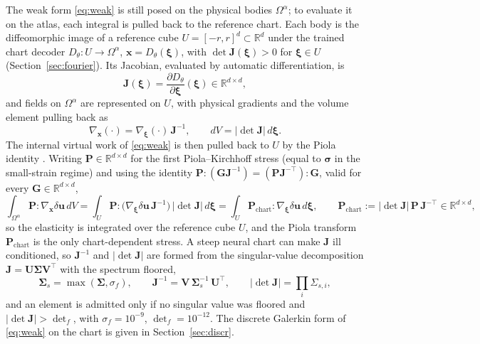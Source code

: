 \documentclass{svjour3}                 %
\newcommand{\R}{\mathbb{R}}
\newcommand{\abs}[1]{\lvert#1\rvert}
\newcommand{\xbf}{\bm{x}}
\newcommand{\ubf}{\bm{u}}
\newcommand{\grad}{\nabla}
\begin{document}
The weak form \eqref{eq:weak} is still posed on the physical bodies $\Omega^\alpha$; to evaluate it on the
atlas, each integral is pulled back to the reference chart. Each body is the diffeomorphic image of a reference
cube $U=[-r,r]^d\subset\R^d$ under the trained chart decoder $D_\theta:U\to\Omega^\alpha$,
$\xbf=D_\theta(\bm\xi)$, with $\det\bm J(\bm\xi)>0$ for $\bm\xi\in U$
(Section~\ref{sec:fourier}). Its Jacobian, evaluated by automatic differentiation, is
\begin{equation}\label{eq:chart-jacobian}
\bm J(\bm\xi)=\frac{\partial D_\theta}{\partial\bm\xi}(\bm\xi)\in\R^{d\times d},
\end{equation}
and fields on $\Omega^\alpha$ are represented on $U$, with physical gradients and the volume element pulling
back as
\begin{equation}\label{eq:pushforward}
\grad_{\xbf}(\cdot)=\grad_{\bm\xi}(\cdot)\,\bm J^{-1},\qquad dV=\abs{\det\bm J}\,d\bm\xi .
\end{equation}
The internal virtual work of \eqref{eq:weak} is then pulled back to $U$ by the Piola identity
\citep{sun2026neuralatlas}. Writing $\bm P\in\R^{d\times d}$ for the first Piola--Kirchhoff stress (equal to
$\bm\sigma$ in the small-strain regime) and using the identity $\bm P:(\bm G\bm J^{-1})=
(\bm P\bm J^{-\top}):\bm G$, valid for every $\bm G\in\R^{d\times d}$,
\begin{equation}\label{eq:piola}
\int_{\Omega^\alpha}\!\bm P:\grad_{\xbf}\delta\ubf\,dV
=\int_{U}\!\bm P:\big(\grad_{\bm\xi}\delta\ubf\,\bm J^{-1}\big)\,\abs{\det\bm J}\,d\bm\xi
=\int_{U}\!\bm P_{\mathrm{chart}}:\grad_{\bm\xi}\delta\ubf\,d\bm\xi ,\qquad
\bm P_{\mathrm{chart}}:=\abs{\det\bm J}\,\bm P\,\bm J^{-\top}\in\R^{d\times d},
\end{equation}
so the elasticity is integrated over the reference cube $U$, and the Piola transform $\bm P_{\mathrm{chart}}$ is
the only chart-dependent stress. A steep neural chart can make $\bm J$ ill conditioned, so
$\bm J^{-1}$ and $\abs{\det\bm J}$ are formed from the singular-value decomposition $\bm J=\bm U
\bm\Sigma\bm V^{\!\top}$ with the spectrum floored,
\begin{equation}\label{eq:svd-stab}
\bm\Sigma_{\!s}=\max(\bm\Sigma,\sigma_{\!f}),\qquad
\bm J^{-1}=\bm V\,\bm\Sigma_{\!s}^{-1}\,\bm U^{\!\top},\qquad
\abs{\det\bm J}=\textstyle\prod_i\Sigma_{s,i},
\end{equation}
and an element is admitted only if no singular value was floored and $\abs{\det\bm J}>\det_f$, with
$\sigma_{\!f}=10^{-9}$, $\det_f=10^{-12}$. The discrete Galerkin form of \eqref{eq:weak} on the chart is given
in Section~\ref{sec:discr}.
\end{document}
